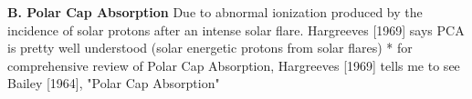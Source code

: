   \textbf{B. Polar Cap Absorption}
     Due to abnormal ionization produced by the incidence of solar protons 
     after an intense solar flare.
     Hargreeves [1969] says PCA is pretty well
     understood (solar energetic protons from solar flares)
     * for comprehensive review of Polar Cap Absorption, Hargreeves [1969]
     tells me to see Bailey [1964], "Polar Cap Absorption"






